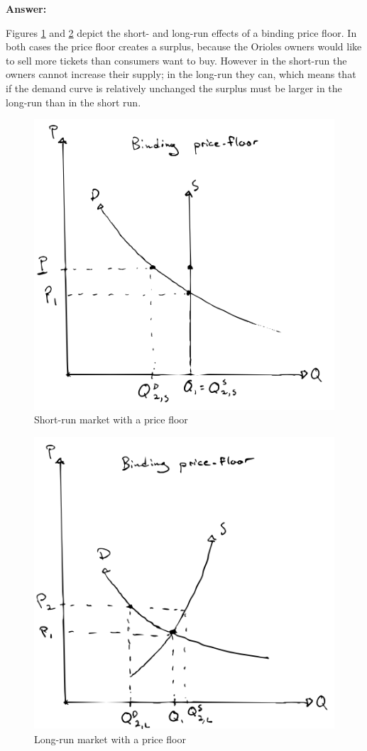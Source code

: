 \documentclass[12pt]{article}
\begin{document}
\textbf{Answer:}

Figures \ref{fig:Orioles_floor_short} and \ref{fig:Orioles_floor_long} depict the short- and long-run effects of a binding price floor. In both cases the price floor creates a surplus, because the Orioles owners would like to sell more tickets than consumers want to buy. However in the short-run the owners cannot increase their supply; in the long-run they can, which means that if the demand curve is relatively unchanged the surplus must be larger in the long-run than in the short run.


\begin{figure}
    \centering
    \includegraphics[width=.6\textwidth]{Orioles_floor_short.png}
    \caption{Short-run market with a price floor}
    \label{fig:Orioles_floor_short}
\end{figure}

\begin{figure}
    \centering
    \includegraphics[width=.6\textwidth]{Orioles_floor_long.png}
    \caption{Long-run market with a price floor}
    \label{fig:Orioles_floor_long}
\end{figure}
\end{document}
